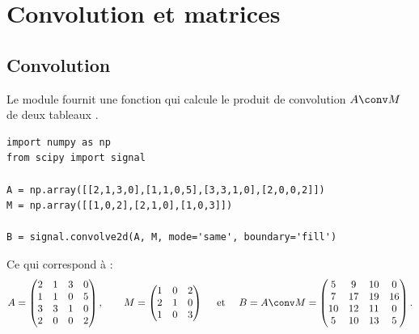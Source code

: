 \documentclass[11pt,class=report,crop=false]{standalone}
\begin{document}
 





\section{Convolution et matrices}

\subsection{Convolution}

Le module  fournit une fonction  qui calcule le produit de convolution $A \conv M$ de deux tableaux \numpy{}.

\begin{lstlisting}
import numpy as np
from scipy import signal

A = np.array([[2,1,3,0],[1,1,0,5],[3,3,1,0],[2,0,0,2]])
M = np.array([[1,0,2],[2,1,0],[1,0,3]])

B = signal.convolve2d(A, M, mode='same', boundary='fill')
\end{lstlisting}

Ce qui correspond à :
$$A = 
 \begin{pmatrix}
2&1&3&0 \\
1&1&0&5 \\
3&3&1&0 \\
2&0&0&2 \\
\end{pmatrix},
\qquad
M = 
\begin{pmatrix}
1&0&2 \\
2&1&0 \\
1&0&3 \\
\end{pmatrix}
\quad\mbox{ et }\quad
B = A \conv M = 
\begin{pmatrix}
 5 & 9  & 10 & 0 \\
 7 & 17 & 19 & 16 \\
10 & 12 & 11 & 0 \\
 5 & 10 & 13 & 5 \\
\end{pmatrix}.$$
\end{document}
